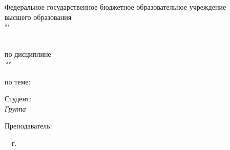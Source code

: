 \thispagestyle{empty}

\begin{center}
  \MakeUppercase{\cfgMinistry}

  \vspace{14pt}

  Федеральное государственное бюджетное образовательное учреждение\\
  высшего образования\\
  "\cfgUniversity{}"

  \vspace{14pt}

  \cfgDepartment
\end{center}

\vfill

\begin{center}
  \MakeUppercase{\cfgReportType}\\
  по дисциплине\\
  \textit{"\cfgDiscipline{}"}

  \vspace{14pt}

  по теме:\\
  {\large\MakeUppercase{\cfgTopic}}
\end{center}

\vfill

\noindent Студент:\\
\textit{Группа \textnumero~\cfgGroup \hfill \cfgStudentShort}

\vspace{14pt}

\noindent Преподаватель:\\
\textit{\cfgTeacherRank \hfill \cfgTeacherShort}

\vfill

\begin{center}
  \cfgCity~\cfgYear~г.
\end{center}
\newpage
